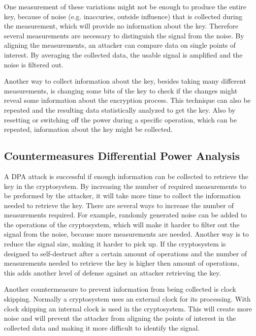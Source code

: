 One measurement of these variations might not be enough to produce the entire key, because of noise (e.g. inaccuries, outside influence) that is collected during the measurement, which will provide no information about the key.
Therefore several measurements are necessary to distinguish the signal from the noise.
By aligning the measurements, an attacker can compare data on single points of interest.
By averaging the collected data, the usable signal is amplified and the noise is filtered out.

Another way to collect information about the key, besides taking many different measurements, is changing some bits of the key to check if the changes might reveal some information about the encryption process.
This technique can also be repeated and the resulting data statistically analyzed to get the key.
Also by resetting or switching off the power during a specific operation, which can be repeated, information about the key might be collected. \cite{kocher2009differential}

\subsection{Countermeasures Differential Power Analysis}
A DPA attack is successful if enough information can be collected to retrieve the key in the cryptosystem.
By increasing the number of required measurements to be preformed by the attacker, it will take more time to collect the information needed to retrieve the key. 
There are several ways to increase the number of measurements required.
For example, randomly generated noise can be added to the operations of the cryptosystem, which will make it harder to filter out the signal from the noise, because more measurements are needed.
Another way is to reduce the signal size, making it harder to pick up. 
If the cryptosystem is designed to self-destruct after a certain amount of operations and the number of measurements needed to retrieve the key is higher then amount of operations, this adds another level of defense against an attacker retrieving the key.

Another countermeasure to prevent information from being collected is clock skipping.
Normally a cryptosystem uses an external clock for its processing.
With clock skipping an internal clock is used in the cryptosystem.
This will create more noise and will prevent the attacker from aligning the points of interest in the collected data and making it more difficult to identify the signal. 

